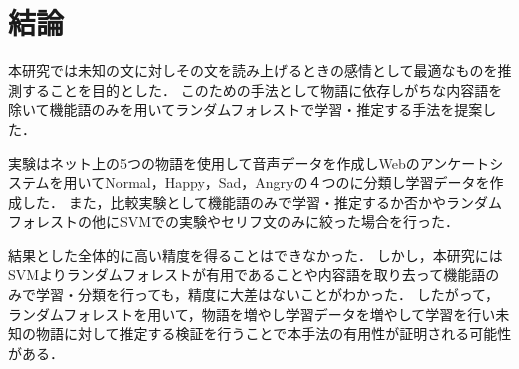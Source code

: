 \chapter{結論}

本研究では未知の文に対しその文を読み上げるときの感情として最適なものを推測することを目的とした．
このための手法として物語に依存しがちな内容語を除いて機能語のみを用いてランダムフォレストで学習・推定する手法を提案した．


実験はネット上の5つの物語を使用して音声データを作成しWebのアンケートシステムを用いてNormal，Happy，Sad，Angryの４つのに分類し学習データを作成した．
また，比較実験として機能語のみで学習・推定するか否かやランダムフォレストの他にSVMでの実験やセリフ文のみに絞った場合を行った．


結果とした全体的に高い精度を得ることはできなかった．
しかし，本研究にはSVMよりランダムフォレストが有用であることや内容語を取り去って機能語のみで学習・分類を行っても，精度に大差はないことがわかった．
したがって，ランダムフォレストを用いて，物語を増やし学習データを増やして学習を行い未知の物語に対して推定する検証を行うことで本手法の有用性が証明される可能性がある．

